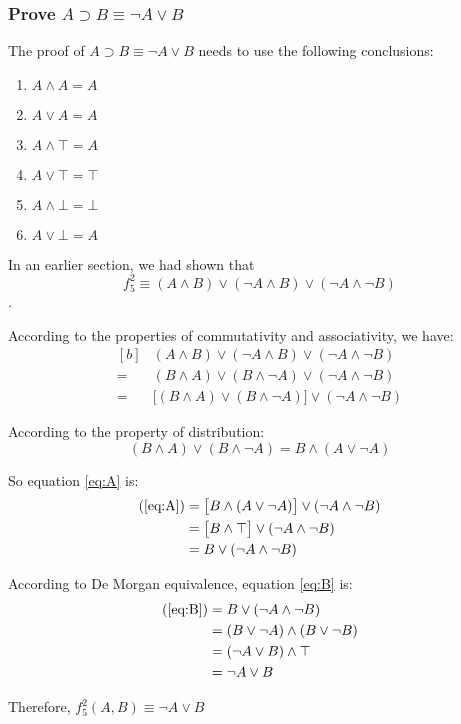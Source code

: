 \documentclass[12pt, letterpaper]{article}
\begin{document}
\subsubsection{Prove $A \supset B \equiv \lnot A \lor B$}

The proof of $A \supset B \equiv \lnot A \lor B$ needs to use the following
conclusions:
\begin{enumerate}
  \item $A \land A = A$
  \item $A \lor A = A$
  \item $A \land \top = A$
  \item $A \lor \top = \top$
  \item $A \land \bot = \bot$
  \item $A \lor \bot = A$
\end{enumerate}

In an earlier section, we had shown that \[ f_5^2 \equiv (A \land B) \lor
  (\lnot A \land B) \lor (\lnot A \land \lnot B) \].

According to the properties of commutativity and associativity, we have:
\begin{equation}\label{eq:A}
  \begin{aligned}[b]
      & (A \land B) \lor (\lnot A \land B) \lor (\lnot A \land \lnot B)             \\
    = & (B \land A) \lor (B \land \lnot A) \lor (\lnot A \land \lnot B)             \\
    = & \bigl[(B \land A) \lor (B \land \lnot A)\bigr] \lor (\lnot A \land \lnot B)
  \end{aligned}
\end{equation}

According to the property of distribution:
\[(B \land A) \lor (B \land \lnot A) = B \land (A \lor \lnot A)\]

So equation \ref{eq:A} is:
\begin{equation}\label{eq:B}
  \begin{aligned}[b]
    (\ref{eq:A})
     & = \bigl[B \land (A \lor \lnot A)\bigr] \lor (\lnot A \land \lnot B) \\
     & = \bigl[B \land \top\bigr] \lor (\lnot A \land \lnot B)             \\
     & = B \lor (\lnot A \land \lnot B)
  \end{aligned}
\end{equation}

According to De Morgan equivalence, equation \ref{eq:B} is:
\begin{equation}\label{eq:C}
  \begin{aligned}[b]
    (\ref{eq:B})
     & = B \lor (\lnot A \land \lnot B)          \\
     & = (B \lor \lnot A) \land (B \lor \lnot B) \\
     & = (\lnot A \lor B) \land \top             \\
     & = \lnot A \lor B
  \end{aligned}
\end{equation}

Therefore, $f_5^2(A, B) \equiv \lnot A \lor B$
\end{document}
